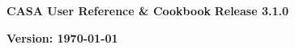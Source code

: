 \pagestyle{empty}

\begin{center}
\Huge
{\bf CASA User Reference \& Cookbook} 
\break 
\break 
\huge
{\bf Release 3.1.0}
\break 
\end{center}
\normalsize

\begin{figure}[h!]
\begin{center}
\end{center}
\end{figure}


\Large
\vfill
\begin{center}
{\bf Version: \today}
\end{center}
\normalsize

\pagebreak
